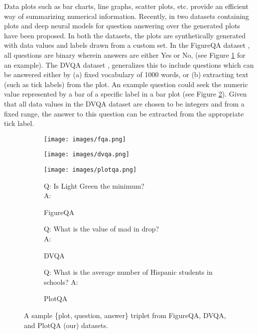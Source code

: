 \documentclass[10pt,twocolumn,letterpaper]{article}
\begin{document}
Data plots such as bar charts, line graphs, scatter plots, etc. provide an efficient way of summarizing numerical information. 
Recently, in \cite{FQA, DVQA} two datasets containing plots and deep neural models for question answering over the generated plots have been proposed. In both the datasets, the plots are synthetically generated with data values and labels drawn from a custom set. In the FigureQA dataset \cite{FQA}, all questions are binary wherein answers are either Yes or No, (see Figure \ref{fig:sample_plots_fqa} for an example).  The DVQA dataset \cite{DVQA}, generalizes this to include questions which can be answered either by (a) fixed vocabulary of 1000 words, or (b) extracting text (such as tick labels) from the plot.  An example question could seek the numeric value represented by a bar of a specific label in a bar plot (see Figure \ref{fig:sample_plots_dvqa}).  Given that all data values in the DVQA dataset are chosen to be integers and from a fixed range, the answer to this question can be extracted from the appropriate tick label. 

\begin{figure*}
\centering
\begin{subfigure}[t]{.32\textwidth}
  \centering
  \texttt{[image: images/fqa.png]}
\end{subfigure}\begin{subfigure}[t]{.32\textwidth}
  \centering
  \texttt{[image: images/dvqa.png]}
\end{subfigure}
\begin{subfigure}[t]{.32\textwidth}
  \centering
  \texttt{[image: images/plotqa.png]}
\end{subfigure}
\begin{subfigure}[t]{.3\textwidth}
  \noindent
  \footnotesize
  Q: Is Light Green the minimum?\\
  A: 
  \caption{FigureQA}
  \label{fig:sample_plots_fqa}
\end{subfigure}
\begin{subfigure}[t]{.3\textwidth}
  \noindent 
  \footnotesize
  Q: What is the value of mad in drop?\\
  A: 
  \caption{DVQA}
  \label{fig:sample_plots_dvqa}
\end{subfigure}
\begin{subfigure}[t]{.3\textwidth}
  \noindent
  \footnotesize
  Q: What is the average number of Hispanic students in schools?
  A: 
  \caption{PlotQA}
  \label{fig:sample_plots_PlotQA}
\end{subfigure}
\caption{
A sample \{plot, question, answer\} triplet from FigureQA, DVQA, and PlotQA (our) datasets.
}
\label{fig:sample_plots}
\end{figure*}
\end{document}
